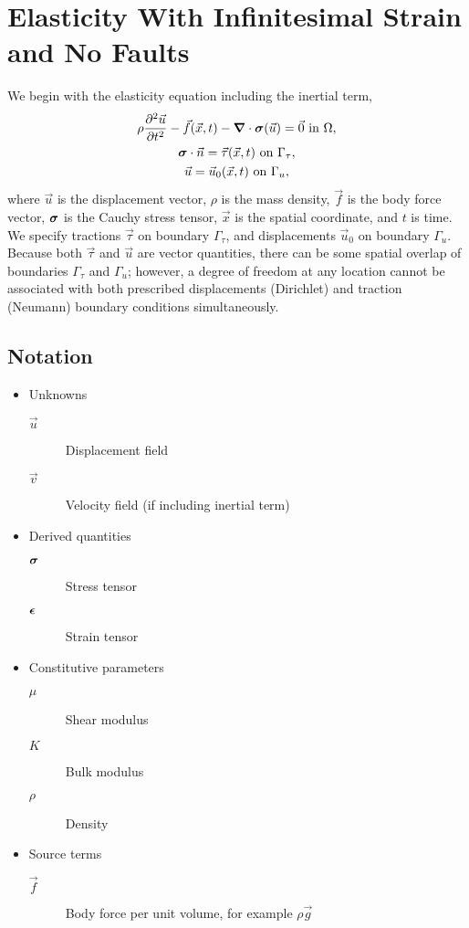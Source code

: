 \section{Elasticity With Infinitesimal Strain and No Faults}

We begin with the elasticity equation including the inertial term,
\begin{gather}
  \label{eqn:elasticity:strong:form}
  \rho \frac{\partial^2\vec{u}}{\partial t^2} - \vec{f}(\vec{x},t) - \tensor{\nabla} \cdot \tensor{\sigma}
  (\vec{u}) = \vec{0} \text{ in }\Omega, \\
%
  \label{eqn:bc:Neumann}
  \tensor{\sigma} \cdot \vec{n} = \vec{\tau}(\vec{x},t) \text{ on }\Gamma_\tau, \\
%
  \label{eqn:bc:Dirichlet}
  \vec{u} = \vec{u}_0(\vec{x},t) \text{ on }\Gamma_u,
\end{gather}
where $\vec{u}$ is the displacement vector, $\rho$ is the mass
density, $\vec{f}$ is the body force vector, $\bm{\sigma}$ is the
Cauchy stress tensor, $\vec{x}$ is the spatial coordinate, and $t$ is
time. We specify tractions $\vec{\tau}$ on boundary $\Gamma_\tau$, and
displacements $\vec{u}_0$ on boundary $\Gamma_u$. Because both $\vec{\tau}$
and $\vec{u}$ are vector quantities, there can be some spatial overlap
of boundaries $\Gamma_\tau$ and $\Gamma_u$; however, a degree of freedom at
any location cannot be associated with both prescribed displacements
(Dirichlet) and traction (Neumann) boundary conditions simultaneously.

\subsection{Notation}
\begin{itemize}
\item Unknowns
  \begin{description}
  \item[$\vec{u}$] Displacement field
  \item[$\vec{v}$] Velocity field (if including inertial term)
  \end{description}
\item Derived quantities
  \begin{description}
    \item[$\bm{\sigma}$] Stress tensor
    \item[$\bm{\epsilon}$] Strain tensor
  \end{description}
\item Constitutive parameters
  \begin{description}
  \item[$\mu$] Shear modulus
  \item[$K$] Bulk modulus
  \item[$\rho$] Density
  \end{description}
\item Source terms
  \begin{description}
    \item[$\vec{f}$] Body force per unit volume, for example $\rho \vec{g}$
  \end{description}
\end{itemize}

